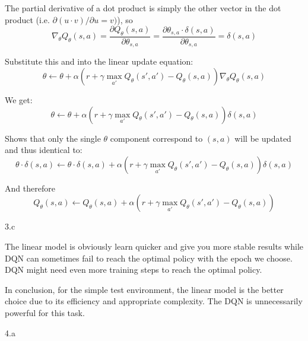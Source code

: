 \begin{answer}
  The partial derivative of a dot product is simply the other vector in the dot product (i.e. $\partial (u \cdot v) / \partial u = v)$), so
  $$
  \nabla_{\theta}Q_{\theta}(s,a) = \frac{\partial Q_{\theta}(s,a)}{\partial \theta_{s,a}} = \frac{\partial \theta_{s,a} \cdot \delta(s,a)}{\partial \theta_{s,a}} = \delta(s,a)
  $$

  Substitute this and into the linear update equation:
  $$
  \theta \leftarrow \theta + \alpha(r + \gamma \max_{a'}Q_{\theta}(s',a') - Q_{\theta}(s,a))\nabla_{\theta}Q_{\theta}(s,a)
  $$

  We get:
  $$
  \theta \leftarrow \theta + \alpha(r + \gamma \max_{a'}Q_{\theta}(s',a') - Q_{\theta}(s,a))\delta(s,a)
  $$

  Shows that only the single $\theta$ component correspond to $(s,a)$ will be updated and thus identical to:
  $$
  \theta \cdot \delta(s,a) \leftarrow \theta \cdot \delta(s,a) + \alpha(r + \gamma \max_{a'}Q_{\theta}(s',a') - Q_{\theta}(s,a))\delta(s,a)
  $$

  And therefore
  $$
  Q_{\theta}(s,a) \leftarrow Q_{\theta}(s,a) + \alpha(r + \gamma \max_{a'}Q_{\theta}(s',a') - Q_{\theta}(s,a))
  $$
\end{answer}
\clearpage


\LARGE
3.c
\normalsize

\begin{answer}
  The linear model is obviously learn quicker and give you more stable results while DQN can
  sometimes fail to reach the optimal policy with the epoch we choose. DQN might need even
  more training steps to reach the optimal policy.

  In conclusion, for the simple test environment, the linear model is the better choice due
  to its efficiency and appropriate complexity. The DQN is unnecessarily powerful for this task.
\end{answer}
\clearpage

\LARGE
4.a
\normalsize

